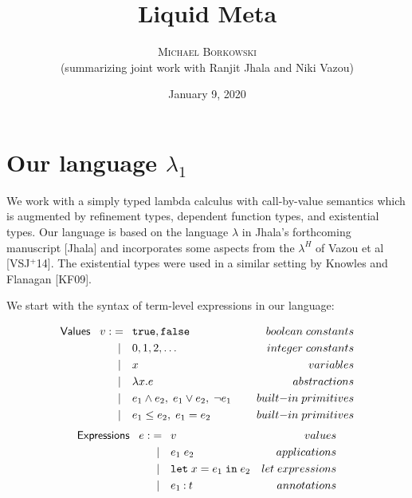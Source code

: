 \documentclass[11pt]{article}
\newcommand{\col}{\mathbin{:}}       %
\begin{document}
\title{Liquid Meta}
\author{\textsc{Michael Borkowski} \\ (summarizing joint work with {\sc Ranjit Jhala} and {\sc Niki Vazou})}
\date{January 9, 2020}

\maketitle
\thispagestyle{empty}

\section{Our language $\lambda_1$}

We work with a simply typed lambda calculus with call-by-value semantics which is augmented by refinement types, dependent function types, and existential types. Our language is based on the language $\lambda$ in Jhala's forthcoming manuscript [Jhala] and incorporates some aspects from the $\lambda^H$ of Vazou et al [VSJ$^+$14]. The existential types were used in a similar setting by Knowles and Flanagan [KF09].

We start with the syntax of term-level expressions in our language:

\begin{align*}
{\sf Values} \;\;\; v :&=\;\: {\tt true}, {\tt false}
                         {\kern 5em}& boolean\; constants\\
                   &\;\;|\quad 0, 1, 2, \ldots 
                         & integer \; constants\\
                   &\;\;|\quad x & variables\\
                   &\;\;|\quad \lambda x . e
                         & abstractions \\
                   &\;\;|\quad e_1 \wedge e_2,\; e_1 \vee e_2,
                         \;\neg e_1 
                         & built{\rm -}in\; primitives \\
                   &\;\;|\quad e_1 \leq e_2,\; e_1 = e_2
                         & built{\rm -}in\; primitives
\end{align*}
\begin{align*}
{\sf Expressions} \;\;\; e :&=\;\: v {\kern 5 em}& values \\
	                &\;\;|\quad e_1\; e_2 & applications \\
	                &\;\;|\quad {\tt let}\; x = e_1
	                      \; {\tt in} \; e_2 & let\; expressions\\
	                &\;\;|\quad e_1 \col t & annotations \\
\end{align*}
\end{document}
